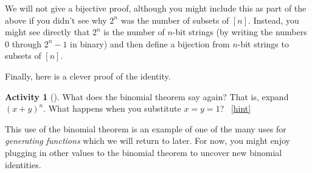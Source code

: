 \documentclass[10pt,]{book}
\theoremstyle{plain}
\theoremstyle{definition}
\theoremstyle{definition}
\theoremstyle{definition}
\newtheorem{activity}[project]{Activity}
\numberwithin{equation}{chapter}
\begin{document}
\hypertarget{p-141}{}%
We will not give a bijective proof, although you might include this as part of the above if you didn't see why \(2^n\) was the number of subsets of \([n]\).  Instead, you might see directly that \(2^n\) is the number of \(n\)-bit strings (by writing the numbers 0 through \(2^n - 1\) in binary) and then define a bijection from \(n\)-bit strings to subsets of \([n]\).%
\par
\hypertarget{p-142}{}%
Finally, here is a clever proof of the identity.%
\begin{activity}[]\label{act-pascalrowsum-binom}
\hypertarget{p-143}{}%
What does the binomial theorem say again?  That is, expand \((x+y)^n\).  What happens when you substitute \(x = y = 1\)?%
~\hfill{\tiny\hyperlink{a-17}{[hint]}\hypertarget{q-17}{}}\end{activity}
\hypertarget{p-146}{}%
This use of the binomial theorem is an example of one of the many uses for \emph{generating functions} which we will return to later.  For now, you might enjoy plugging in other values to the binomial theorem to uncover new binomial identities.%
\typeout{************************************************}
\typeout{************************************************}
\end{document}
